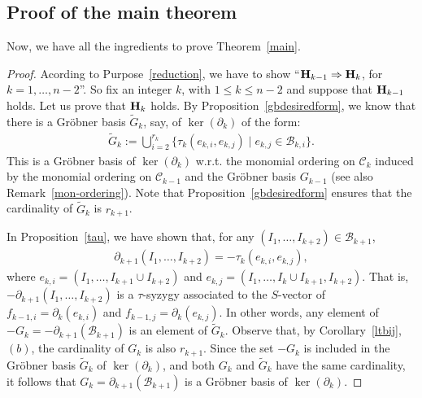 \documentclass[ALCO]{cedram}
\newcommand{\mcb}{\mbox{$\mathcal{B}$}}
\newcommand{\mcc}{\mbox{$\mathcal{C}$}}
\newcommand{\mbfh}{\mbox{${\bf H}$}}
\newcommand{\dif}{\mbox{$\partial$}}
\begin{document}
\subsection{Proof of the main theorem}

 Now, we have all the ingredients to prove
Theorem~\ref{main}.

\begin{proof} Acording to Purpose~\ref{reduction},
we have to show ``$\mbfh_{k-1}\Rightarrow \mbfh_{k}$, for $k=1,\ldots
,n-2$''. So fix an integer $k$, with $1\leq k\leq n-2$ and suppose
that $\mbfh_{k-1}$ holds. Let us prove that $\mbfh_k$ holds. By
Proposition~\ref{gbdesiredform}, we know that there is a Gr\"obner
basis $\tilde{G}_k$, say, of $\ker(\dif_{k})$ of the form: 
\begin{eqnarray}\label{groebf}
\tilde{G}_k:=\bigcup_{i=2}^{r_{k}}\{ \tau_{k}(e_{k,i},e_{k,j})\mid
e_{k,j}\in\mcb_{k,i}\}.
\end{eqnarray}
This is a Gr\"obner basis of $\ker(\dif_{k})$ w.r.t. the monomial
ordering on $\mcc_k$ induced by the monomial ordering on $\mcc_{k-1}$
and the Gr\"obner basis $G_{k-1}$ (see also
Remark~\ref{mon-ordering}). Note that Proposition~\ref{gbdesiredform}
ensures that the cardinality of $\tilde{G}_k$ is $r_{k+1}$.

In Proposition~\ref{tau}, we have shown that, for any $(I_1,\ldots
,I_{k+2})\in\mcb_{k+1}$,
\begin{eqnarray*}
\dif_{k+1}(I_1,\ldots,I_{k+2})=-\tau_{k}(e_{k,i},e_{k,j}),
\end{eqnarray*}
where $e_{k,i}=(I_1,\ldots ,I_{k+1}\cup I_{k+2})$ and
$e_{k,j}=(I_1,\ldots,I_{k}\cup I_{k+1},I_{k+2})$. That is,
$-\dif_{k+1}(I_1,\ldots,I_{k+2})$ is a $\tau$-syzygy associated to the
$S$-vector of $f_{k-1,i}=\dif_{k}(e_{k,i})$ and
$f_{k-1,j}=\dif_{k}(e_{k,j})$. In other words, any element of
$-G_{k}=-\dif_{k+1}(\mcb_{k+1})$ is an element of
$\tilde{G}_k$. Observe that, by Corollary~\ref{ltbij}, $(b)$, the
cardinality of $G_k$ is also $r_{k+1}$. Since the set $-G_{k}$ is
included in the Gr\"obner basis $\tilde{G}_k$ of $\ker(\dif_k)$, and
both $G_k$ and $\tilde{G}_k$ have the same cardinality, it follows
that $G_k=\dif_{k+1}(\mcb_{k+1})$ is a Gr\"obner basis of
$\ker(\dif_{k})$.


\end{proof}
\end{document}
